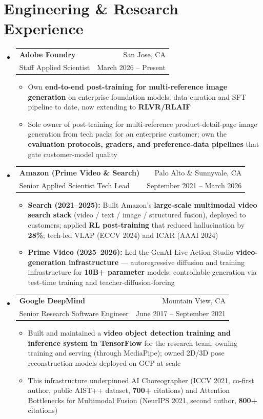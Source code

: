 \documentclass[letterpaper,11pt]{article}
\makeatletter
\newcommand{\resumeItem}[1]{
  \item\small{
    {#1 \vspace{-2pt}}
  }
}
\newcommand{\resumeSubheading}[4]{
  \vspace{-2pt}\item
    \begin{tabular*}{0.97\textwidth}[t]{l@{\extracolsep{\fill}}r}
      \textbf{#1} & #2 \\
      \small#3 & \small #4 \\
    \end{tabular*}\vspace{-7pt}
}
\newcommand{\resumeSubHeadingListStart}{\begin{itemize}[leftmargin=0.15in, label={}]}
\newcommand{\resumeSubHeadingListEnd}{\end{itemize}}
\newcommand{\resumeItemListStart}{\begin{itemize}[leftmargin=0.15in]}
\newcommand{\resumeItemListEnd}{\end{itemize}\vspace{-5pt}}
\makeatother
\begin{document}
\section{Engineering \& Research Experience}
  \resumeSubHeadingListStart

    \resumeSubheading
      {Adobe Foundry}{San Jose, CA}
      {Staff Applied Scientist}{March 2026 -- Present}
      \resumeItemListStart
        \resumeItem{Own \textbf{end-to-end post-training for multi-reference image generation} on enterprise foundation models: data curation and SFT pipeline to date, now extending to \textbf{RLVR/RLAIF}}
        \resumeItem{Sole owner of post-training for multi-reference product-detail-page image generation from tech packs for an enterprise customer; own the \textbf{evaluation protocols, graders, and preference-data pipelines} that gate customer-model quality}
      \resumeItemListEnd

    \resumeSubheading
      {Amazon (Prime Video \& Search)}{Palo Alto \& Sunnyvale, CA}
      {Senior Applied Scientist Tech Lead}{September 2021 -- March 2026}
      \resumeItemListStart
        \resumeItem{\textbf{Search (2021--2025):} Built Amazon's \textbf{large-scale multimodal video search stack} (video / text / image / structured fusion), deployed to customers; applied \textbf{RL post-training} that reduced hallucination by \textbf{28\%}; tech-led VLAP (ECCV 2024) and ICAR (AAAI 2024)}
        \resumeItem{\textbf{Prime Video (2025--2026):} Led the GenAI Live Action Studio \textbf{video-generation infrastructure} --- autoregressive diffusion and training infrastructure for \textbf{10B+ parameter} models; controllable generation via test-time training and teacher-diffusion-forcing}
      \resumeItemListEnd

    \resumeSubheading
      {Google DeepMind}{Mountain View, CA}
      {Senior Research Software Engineer}{June 2017 -- September 2021}
      \resumeItemListStart
        \resumeItem{Built and maintained a \textbf{video object detection training and inference system in TensorFlow} for the research team, owning training and serving (through MediaPipe); owned 2D/3D pose reconstruction models deployed on GCP at scale}
        \resumeItem{This infrastructure underpinned AI Choreographer (ICCV 2021, co-first author, public AIST++ dataset, \textbf{700+} citations) and Attention Bottlenecks for Multimodal Fusion (NeurIPS 2021, second author, \textbf{800+} citations)}
      \resumeItemListEnd

  \resumeSubHeadingListEnd
\end{document}

